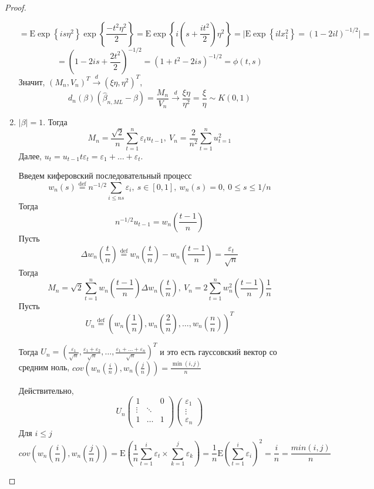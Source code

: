 \documentclass[12pt]{article}
\theoremstyle{basic_theorem}
\newcommand*{\defeq}{\stackrel{\text{def}}{=}}
\def\eps{ \varepsilon }
\def\E{ \mathrm{E} }
\begin{document}
\begin{proof}
\begin{enumerate}
        \[=\E\exp{\left\{is\eta^2\right\}}\exp{\left\{\frac{-t^2\eta^2}{2}\right\}}=\E\exp{\left\{i\left(s+\frac{it^2}{2}\right)\eta^2\right\}}=\Big\lvert\E\exp{\left\{ilx_1^2\right\}}=(1-2il)^{-1/2}\Big\rvert=\]
        \[=\left(1-2is+\frac{2t^2}{2}\right)^{-1/2}=(1+t^2-2is)^{-1/2}=\phi(t,s)\]
        Значит, $(M_n,V_n)^T\xrightarrow{d}(\xi\eta,\eta^2)^T$,
        \[d_n(\beta)(\widehat{\beta}_{n,ML}-\beta)=\frac{M_n}{V_n}\xrightarrow{d}\frac{\xi\eta}{\eta^2}=\frac{\xi}{\eta}\sim K(0,1)\]
        \item \underline{$|\beta|=1$}. Тогда
        \[M_n=\frac{\sqrt{2}}{n}\sum_{t=1}^n\eps_tu_{t-1},\ V_n=\frac{2}{n^2}\sum_{t=1}^nu_{t=1}^2\]
        Далее, $u_t=u_{t-1}t\eps_t=\eps_1+\ldots+\eps_t$.

        Введем киферовский последовательный процесс
        \[w_n(s)\defeq n^{-1/2}\sum_{i\leq ns}\eps_i,\ s\in[0,1],\ w_n(s)=0,\ 0\leq s\leq 1/n\]
        Тогда 
        \[n^{-1/2}u_{t-1}=w_n\left(\frac{t-1}{n}\right)\]
        Пусть
        \[\Delta w_n\left(\frac{t}{n}\right)\defeq w_n\left(\frac{t}{n}\right)-w_n\left(\frac{t-1}{n}\right)=\frac{\eps_t}{\sqrt{n}}\]
        Тогда
        \[M_n=\sqrt{2}\sum_{t=1}^nw_n\left(\frac{t-1}{n}\right)\Delta w_n\left(\frac{t}{n}\right),\ V_n=2\sum_{t=1}^nw_n^2\left(\frac{t-1}{n}\right)\frac{1}{n}\]
        Пусть
        \[U_n\defeq \left(w_n\left(\frac{1}{n}\right), w_n\left(\frac{2}{n}\right),\ldots,w_n\left(\frac{n}{n}\right)\right)^T\]
        \begin{leftbar}
            Тогда $U_n=\left(\frac{\eps_1}{\sqrt{n}},\frac{\eps_1+\eps_2}{\sqrt{n}},\ldots,\frac{\eps_1+\ldots+\eps_n}{\sqrt{n}}\right)^T$
            и это есть гауссовский вектор со средним ноль, $cov\left(w_n\left(\frac{i}{n}\right),w_n\left(\frac{j}{n}\right)\right)=\frac{\min(i,j)}{n}$
        \end{leftbar}
        Действительно,
        \[U_n\begin{pmatrix}
            1      &        & 0 \\
            \vdots & \ddots &    \\
            1      & \ldots &  1 \\
        \end{pmatrix}\begin{pmatrix}
            \eps_1  \\ \vdots \\ \eps_n
        \end{pmatrix}\]
        Для $i\leq j$
        \[cov\left(w_n\left(\frac{i}{n}\right),w_n\left(\frac{j}{n}\right)\right)=\E\left(\frac{1}{n}\sum_{t=1}^i\eps_t\times\sum_{k=1}^j\eps_k\right)=\frac{1}{n}\E\left(\sum_{t=1}^i\eps_i\right)^2=\frac{i}{n}=\frac{min(i,j)}{n}\]

\end{enumerate}
\end{proof}
\end{document}
